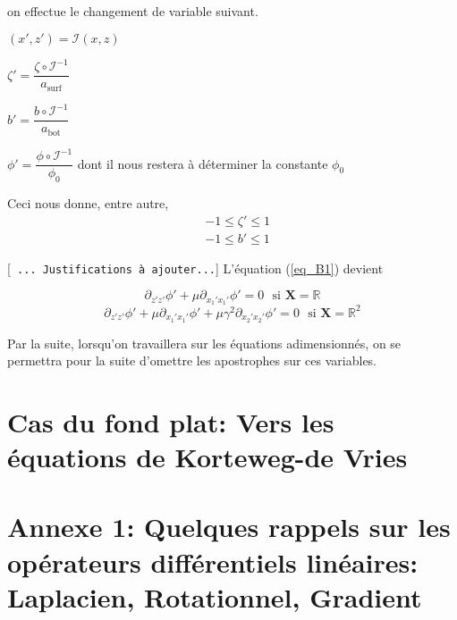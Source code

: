 \documentclass[12pt,a4paper]{article}
\numberwithin{equation}{section}
\begin{document}
    
   
    

on effectue le changement de variable suivant.

\begin{list}{\textbullet}{}
    \item $(x',z') = \mathcal{I} (x,z)$
    \item $\zeta' = \dfrac{\zeta \circ \mathcal{I}^{-1}}{a_{\text{surf}}}$
    \item $b' = \dfrac{b\circ\mathcal{I}^{-1}}{a_{\text{bot}}}$
     \item $\phi' = \dfrac{\phi \circ \mathcal{I}^{-1}}{\phi_0}$   dont il nous restera à déterminer la constante $\phi_0$
\end{list}

Ceci nous donne, entre autre, 
\begin{align}
    &-1 \leq \zeta' \leq 1\\ &-1 \leq b' \leq 1
\end{align}

[\texttt{ ... Justifications à ajouter...}] L'équation (\ref{eq_B1}) devient 

$$\partial_{z'z'}\phi' + \mu \partial_{x_1'x_1'}\phi' = 0 ~~~ \text{si }\textbf{X} = \mathbb{R} $$
$$\partial_{z'z'}\phi' + \mu \partial_{x_1'x_1'}\phi' + \mu \gamma^2 \partial_{x_2'x_2'}\phi' = 0 ~~~ \text{si }\textbf{X} = \mathbb{R}^2$$



Par la suite, lorsqu'on travaillera sur les équations adimensionnés, on se permettra pour la suite d'omettre les apostrophes sur ces variables.
\section{Cas du fond plat: Vers les équations de Korteweg-de Vries} 





\section{Annexe 1: Quelques rappels sur les opérateurs différentiels linéaires: Laplacien, Rotationnel, Gradient}
\end{document}
